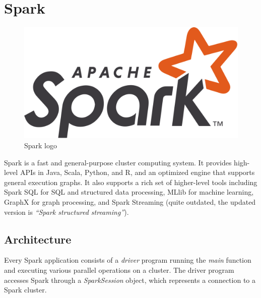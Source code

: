 \section{Spark}
\begin{paracol}{2}
   \begin{figure}[htbp]
      \centering
      \includegraphics{images/14/spark_logo.png}
      \caption{Spark logo}
      \label{fig:14/spark_logo}
   \end{figure}
\end{paracol}
Spark is a fast and general-purpose cluster computing system. It provides high-level APIs in Java, Scala, Python, and R, and an optimized engine that supports general execution graphs. It also supports a rich set of higher-level tools including Spark SQL for SQL and structured data processing, MLlib for machine learning, GraphX for graph processing, and Spark Streaming (quite outdated, the updated version is \textit{``Spark structured streaming''}).



\subsection{Architecture}
Every Spark application consists of a \textit{driver} program running the \textit{main} function and executing various parallel operations on a cluster. The driver program accesses Spark through a \textit{SparkSession} object, which represents a connection to a Spark cluster.

